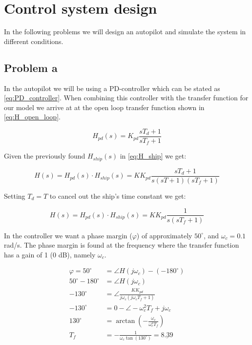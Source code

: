 \section{Control system design} \label{sec:Autopilot}

In the following problems we will design an autopilot and simulate the system in different conditions.

\subsection{Problem a}
In the autopilot we will be using a PD-controller which can be stated as \cref{eq:PD_controller}. When combining this controller with the transfer function for our model we arrive at at the open loop transfer function shown in \cref{eq:H_open_loop}.

\begin{equation} \label{eq:PD_controller}
    H_{pd}(s) = K_{pd} \frac{sT_d + 1}{s T_f + 1}
\end{equation}

Given the previously found $H_{ship}(s)$ in \cref{eq:H_ship} we get:

\begin{equation} \label{eq:H_open_loop}
    H(s) = H_{pd}(s) \cdot H_{ship}(s) = K K_{pd} \frac{s T_d + 1}{s (s T + 1)(s T_f + 1)}
\end{equation}

Setting $T_d = T$ to cancel out the ship's time constant we get:



\begin{equation} \label{eq:H_open_loop}
    H(s) = H_{pd}(s) \cdot H_{ship}(s) = K K_{pd} \frac{1}{s (s T_f + 1)}
\end{equation}


In the controller we want a phase margin ($\varphi$) of approximately $50^\circ$, and $\omega_c = 0.1$ rad/s. The phase margin is found at the frequency where the transfer function has a gain of 1 (0 dB), namely $\omega_c$. \cite{regtek}

\begin{subequations} \label{eq:T_f}
    \begin{align}
        \varphi = 50^\circ &= \angle H(j \omega_c) - (-180^\circ) \\
        50^\circ - 180^\circ &= \angle H(j \omega_c) \\
        -130^\circ &= \angle \frac{K K_{pd}}{j \omega_c (j \omega_c T_f + 1)} \\
        -130^\circ &= 0 - \angle -\omega_c^2 T_f + j \omega_c \\
        130^\circ &= \arctan(-\frac{\omega_c}{\omega_c^2 T_f}) \\
        T_f &= -\frac{1}{\omega_c \tan(130^\circ)} = \underline{8.39}
    \end{align}
\end{subequations}

